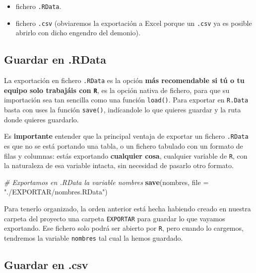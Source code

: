 \documentclass[11pt,]{book}
\newenvironment{Shaded}{\begin{snugshade}}{\end{snugshade}}
\newcommand{\CommentTok}[1]{\textcolor[rgb]{0.37,0.37,0.37}{\textit{#1}}}
\newcommand{\DataTypeTok}[1]{\textcolor[rgb]{0.27,0.27,0.27}{#1}}
\newcommand{\KeywordTok}[1]{\textcolor[rgb]{0.27,0.27,0.27}{\textbf{#1}}}
\newcommand{\NormalTok}[1]{#1}
\newcommand{\StringTok}[1]{\textcolor[rgb]{0.5,0.5,0.5}{#1}}
\providecommand{\tightlist}{%
  \setlength{\itemsep}{0pt}\setlength{\parskip}{0pt}}
\begin{document}
\begin{itemize}
\tightlist
\item
  fichero \texttt{.RData}.
\item
  fichero \texttt{.csv} (obviaremos la exportación a Excel porque un \texttt{.csv} ya es posible abrirlo con dicho engendro del demonio).
\end{itemize}

\hypertarget{guardar-en-.rdata}{%
\subsection{Guardar en .RData}\label{guardar-en-.rdata}}

La exportación en fichero \texttt{.RData} es la opción \textbf{más recomendable si tú o tu equipo solo trabajáis con \texttt{R}}, es la opción nativa de fichero, para que su importación sea tan sencilla como una función \texttt{load()}. Para exportar en \texttt{R.Data} basta con uses la función \texttt{save()}, indícandole lo que quieres guardar y la ruta donde quieres guardarlo.

Es \textbf{importante} entender que la principal ventaja de exportar un fichero \texttt{.RData} es que no se está portando una tabla, o un fichero tabulado con un formato de filas y columnas: estás exportando \textbf{cualquier cosa}, cualquier variable de \texttt{R}, con la naturaleza de esa variable intacta, sin necesidad de pasarlo otro formato.

\begin{Shaded}
\begin{Highlighting}[]
\CommentTok{# Exportamos en .RData la variable nombres }
\KeywordTok{save}\NormalTok{(nombres, }\DataTypeTok{file =} \StringTok{"./EXPORTAR/nombres.RData"}\NormalTok{)}
\end{Highlighting}
\end{Shaded}

Para tenerlo organizado, la orden anterior está hecha habiendo creado en nuestra carpeta del proyecto una carpeta \texttt{EXPORTAR} para guardar lo que vayamos exportando. Ese fichero solo podrá ser abierto por \texttt{R}, pero cuando lo cargemos, tendremos la variable \texttt{nombres} tal cual la hemos guardado.

\hypertarget{guardar-en-.csv}{%
\subsection{Guardar en .csv}\label{guardar-en-.csv}}
\end{document}
